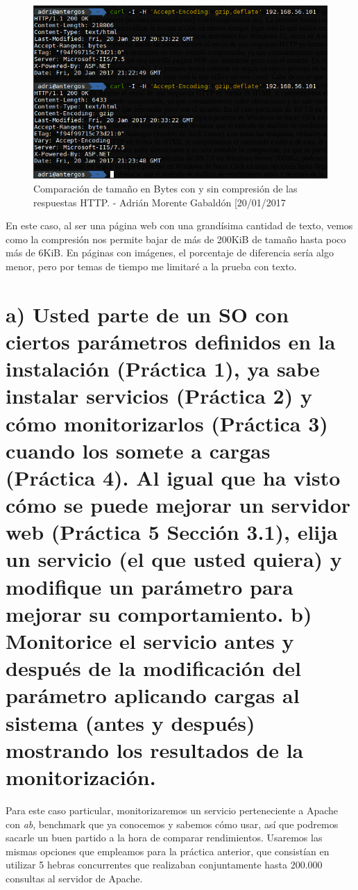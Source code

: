 \begin{figure}[H]
	\centering
	\includegraphics[scale=0.6]{curl-final}
	\caption{Comparación de tamaño en Bytes con y sin compresión de las respuestas HTTP. - Adrián Morente Gabaldón [20/01/2017}
	\label{figura18}
\end{figure}
En este caso, al ser una página web con una grandísima cantidad de texto, vemos como la compresión nos permite bajar de más de 200KiB de tamaño hasta poco más de 6KiB. En páginas con imágenes, el porcentaje de diferencia sería algo menor, pero por temas de tiempo me limitaré a la prueba con texto.


\section{a) Usted parte de un SO con ciertos parámetros definidos en la instalación (Práctica 1), ya sabe instalar servicios (Práctica 2) y cómo monitorizarlos (Práctica 3) cuando los somete a cargas (Práctica 4). Al igual que ha visto cómo se puede mejorar un servidor web (Práctica 5 Sección 3.1), elija un servicio (el que usted quiera) y modifique un parámetro para mejorar su comportamiento. b) Monitorice el servicio antes y después de la modificación del parámetro aplicando cargas al sistema (antes y después) mostrando los resultados de la monitorización.}
Para este caso particular, monitorizaremos un servicio perteneciente a Apache con \emph{ab}, benchmark que ya conocemos y sabemos cómo usar, así que podremos sacarle un buen partido a la hora de comparar rendimientos. Usaremos las mismas opciones que empleamos para la práctica anterior, que consistían en utilizar 5 hebras concurrentes que realizaban conjuntamente hasta 200.000 consultas al servidor de Apache.\\

